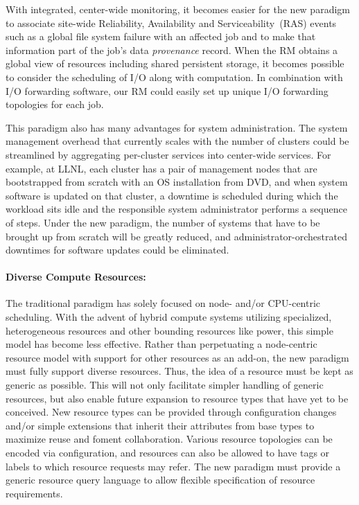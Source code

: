 \documentclass{article}
\begin{document}
With integrated, center-wide monitoring, it becomes easier
for the new paradigm to associate site-wide Reliability, Availability and Serviceability~(RAS) 
events such as a global file system
failure with an affected job and to make that information part of
the job's data {\em provenance} record. When the RM obtains a global view of
resources including shared persistent storage, it becomes possible to
consider the scheduling of I/O along with computation. In combination with
I/O forwarding software, our RM could easily set up unique I/O forwarding
topologies for each job.

This paradigm also has many advantages for system administration.
The system management overhead that currently scales with the number of clusters
could be streamlined by aggregating per-cluster services into center-wide
services. For example, at LLNL, each cluster has a pair of management
nodes that are bootstrapped from scratch with an OS installation from DVD,
and when system software is updated on that cluster, a downtime is
scheduled during which the workload sits idle and the responsible system
administrator performs a sequence of steps. Under the new paradigm, the
number of systems that have to be brought up from scratch will be
greatly reduced, and administrator-orchestrated downtimes for software
updates could be eliminated. 


\paragraph{Diverse Compute Resources:}
The traditional paradigm has solely focused on node- and/or CPU-centric
scheduling. With the advent of hybrid compute systems utilizing specialized,
heterogeneous resources and other bounding resources like power, 
this simple model has become less effective. Rather than
perpetuating a node-centric resource model with support for other
resources as an add-on, the new paradigm must fully support diverse resources. 
Thus, the idea of a resource must be kept as generic as
possible. This will not only facilitate simpler handling of generic resources,
but also enable future expansion to resource types that have yet to
be conceived. New resource types can be provided through configuration changes
and/or simple extensions that inherit their attributes from base types 
to maximize reuse and foment collaboration.  Various resource topologies
can be encoded via configuration, and resources can also be allowed to have tags or labels
to which resource requests may refer. 
The new paradigm must provide a generic resource query language to allow flexible
specification of resource requirements.
\end{document}
